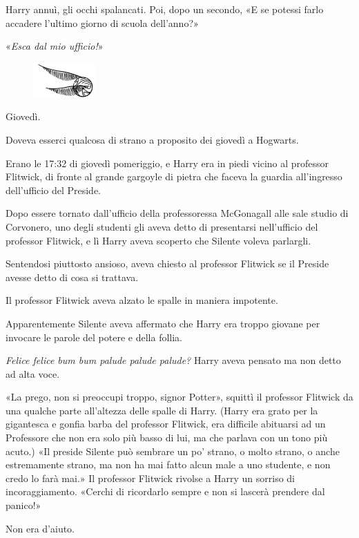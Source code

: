 Harry annuì, gli occhi spalancati. Poi, dopo un secondo, «E se potessi farlo accadere l’ultimo giorno di scuola dell’anno?»

«\textit{Esca dal mio ufficio!}»

\begin{figure}[h!]
        \includegraphics[scale=0.4]{boccino.png}
        \centering
\end{figure}

Giovedì.

Doveva esserci qualcosa di strano a proposito dei giovedì a Hogwarts.

Erano le 17:32 di giovedì pomeriggio, e Harry era in piedi vicino al professor Flitwick, di fronte al grande gargoyle di pietra che faceva la guardia all’ingresso dell’ufficio del Preside.

Dopo essere tornato dall’ufficio della professoressa McGonagall alle sale studio di Corvonero, uno degli studenti gli aveva detto di presentarsi nell’ufficio del professor Flitwick, e lì Harry aveva scoperto che Silente voleva parlargli.

Sentendosi piuttosto ansioso, aveva chiesto al professor Flitwick se il Preside avesse detto di cosa si trattava.

Il professor Flitwick aveva alzato le spalle in maniera impotente.

Apparentemente Silente aveva affermato che Harry era troppo giovane per invocare le parole del potere e della follia.

\textit{Felice felice bum bum palude palude palude?} Harry aveva pensato ma non detto ad alta voce.

«La prego, non si preoccupi troppo, signor Potter», squittì il professor Flitwick da una qualche parte all’altezza delle spalle di Harry. (Harry era grato per la gigantesca e gonfia barba del professor Flitwick, era difficile abituarsi ad un Professore che non era solo più basso di lui, ma che parlava con un tono più acuto.) «Il preside Silente può sembrare un po’ strano, o molto strano, o anche estremamente strano, ma non ha mai fatto alcun male a uno studente, e non credo lo farà mai.» Il professor Flitwick rivolse a Harry un sorriso di incoraggiamento. «Cerchi di ricordarlo sempre e non si lascerà prendere dal panico!»

Non era d’aiuto.

